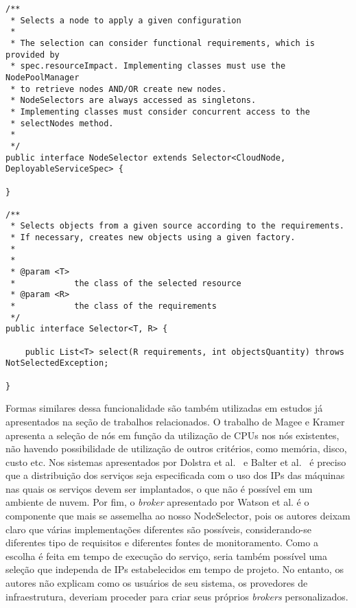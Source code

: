 \begin{description}
\begin{lstlisting}[frame=trbl, label=lst:node_selector, caption=Interface NodeSelector acompanhada de sua classe pai Selector.]
/**
 * Selects a node to apply a given configuration
 * 
 * The selection can consider functional requirements, which is provided by
 * spec.resourceImpact. Implementing classes must use the NodePoolManager 
 * to retrieve nodes AND/OR create new nodes. 
 * NodeSelectors are always accessed as singletons. 
 * Implementing classes must consider concurrent access to the
 * selectNodes method.
 *  
 */
public interface NodeSelector extends Selector<CloudNode, DeployableServiceSpec> {

}

/**
 * Selects objects from a given source according to the requirements. 
 * If necessary, creates new objects using a given factory.
 * 
 * 
 * @param <T>
 *            the class of the selected resource
 * @param <R>
 *            the class of the requirements
 */
public interface Selector<T, R> {

    public List<T> select(R requirements, int objectsQuantity) throws NotSelectedException;

}
\end{lstlisting}

Formas similares dessa funcionalidade são também utilizadas em estudos já apresentados na seção de trabalhos relacionados.  O trabalho de Magee e Kramer~\cite{Magee1997Corba} apresenta a seleção de nós em função da utilização de CPUs nos nós existentes, não havendo possibilidade de utilização de outros critérios, como memória, disco, custo etc. Nos sistemas apresentados por Dolstra et al.~\cite{Dolstra2005Configuration} e Balter et al.~\cite{Balter1998Olan} é preciso que a distribuição dos serviços seja especificada com o uso dos IPs das máquinas nas quais os serviços devem ser implantados, o que não é possível em um ambiente de nuvem. Por fim, o \emph{broker} apresentado por Watson et al. é o componente que mais se assemelha ao nosso NodeSelector, pois os autores deixam claro que várias implementações diferentes são possíveis, considerando-se diferentes tipo de requisitos e diferentes fontes de monitoramento. Como a escolha é feita em tempo de execução do serviço, seria também possível uma seleção que independa de IPs estabelecidos em tempo de projeto. No entanto, os autores não explicam como os usuários de seu sistema, os provedores de infraestrutura, deveriam proceder para criar seus próprios \emph{brokers} personalizados.


\end{description}
